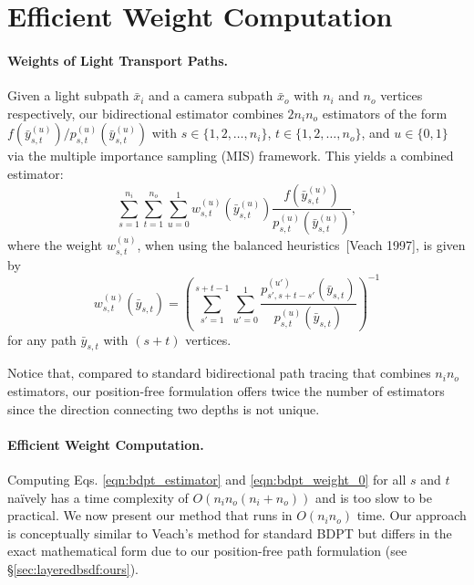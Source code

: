 \section{Efficient Weight Computation}
\label{sec:layeredbsdf:weight_computation}


\paragraph{Weights of Light Transport Paths.}

Given a light subpath $\bar{x}_i$ and a camera subpath $\bar{x}_o$ with $n_i$ and $n_o$ vertices respectively, our bidirectional estimator combines $2 n_i n_o$ estimators of the form $f(\bar{y}^{(u)}_{s,t})/p^{(u)}_{s,t}(\bar{y}^{(u)}_{s,t})$ with $s \in \{1, 2, \ldots, n_i\}$, $t \in \{1, 2, \ldots, n_o\}$, and $u \in \{0, 1\}$ via the multiple importance sampling (MIS) framework.
This yields a combined estimator:
\begin{equation}
\label{eqn:bdpt_estimator}
\sum_{s = 1}^{n_i} \sum_{t = 1}^{n_o} \sum_{u = 0}^1 w^{(u)}_{s, t}(\bar{y}^{(u)}_{s,t}) \frac{f(\bar{y}^{(u)}_{s,t})}{p^{(u)}_{s,t}(\bar{y}^{(u)}_{s,t})},
\end{equation}
where the weight $w^{(u)}_{s, t}$, when using the balanced heuristics~[Veach 1997], is given by
\begin{equation}
\label{eqn:bdpt_weight_0}
w^{(u)}_{s, t}(\bar{y}_{s,t})
= \left(\sum_{s' = 1}^{s + t - 1} \sum_{u'=0}^1 \frac{p^{(u')}_{s', s + t - s'}(\bar{y}_{s,t})}{p^{(u)}_{s,t}(\bar{y}_{s,t})}\right)^{-1}
\end{equation}
for any path $\bar{y}_{s,t}$ with $(s + t)$ vertices.

Notice that, compared to standard bidirectional path tracing that combines $n_i n_o$ estimators, our position-free formulation offers twice the number of estimators since the direction connecting two depths is not unique.


\paragraph{Efficient Weight Computation.}

Computing Eqs. \eqref{eqn:bdpt_estimator} and \eqref{eqn:bdpt_weight_0} for all $s$ and $t$ na\"ively has a time complexity of $O(n_i n_o (n_i + n_o))$ and is too slow to be practical.
We now present our method that runs in $O(n_i n_o)$ time.
Our approach is conceptually similar to Veach's method for standard BDPT but differs in the exact mathematical form due to our position-free path formulation (see \S\ref{sec:layeredbsdf:ours}).

